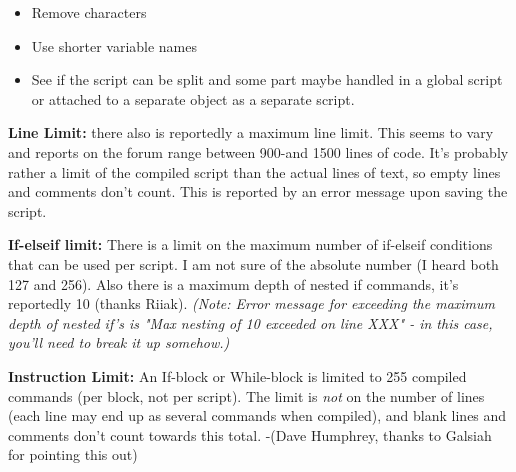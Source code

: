 \begin{itemize}
\item
  Remove characters
\end{itemize}

\begin{itemize}
\item
  Use shorter variable names
\item
  See if the script can be split and some part maybe handled in a global
  script or attached to a separate object as a separate script.
\end{itemize}

\textbf{Line Limit:} there also is reportedly a maximum line limit. This
seems to vary and reports on the forum range between 900-and 1500 lines
of code. It's probably rather a limit of the compiled script than the
actual lines of text, so empty lines and comments don't count. This is
reported by an error message upon saving the script.

\textbf{If-elseif limit:} There is a limit on the maximum number of
if-elseif conditions that can be used per script. I am not sure of the
absolute number (I heard both 127 and 256). Also there is a maximum
depth of nested if commands, it's reportedly 10 (thanks Riiak).
\emph{(Note: Error message for exceeding the maximum depth of nested
if's is "Max nesting of 10 exceeded on line XXX" - in this case, you'll
need to break it up somehow.)}

\textbf{Instruction Limit:} An If-block or While-block is limited to 255
compiled commands (per block, not per script). The limit is \emph{not}
on the number of lines (each line may end up as several commands when
compiled), and blank lines and comments don't count towards this total.
-(Dave Humphrey, thanks to Galsiah for pointing this out)

